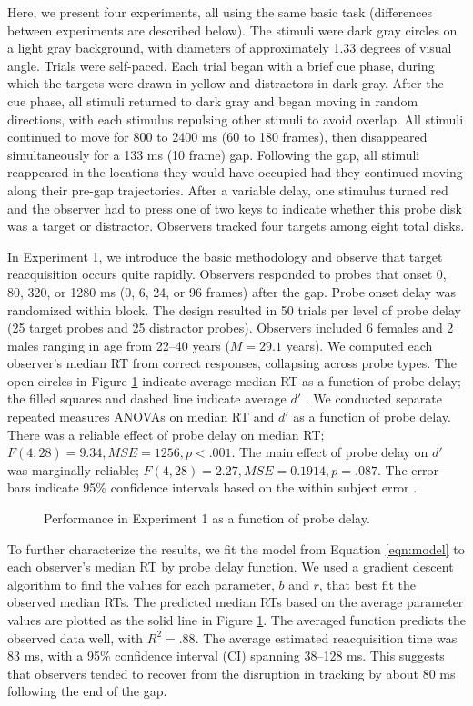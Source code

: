 \documentclass[jou,nobf]{apa}
\newcommand{\MSE}{\ensuremath{\mathit{MSE}}}
\begin{document}
Here, we present four experiments, all using the same basic task
(differences between experiments are described below).  The stimuli were
dark gray circles on a light gray background, with diameters of
approximately 1.33 degrees of visual angle.  Trials were self-paced.  Each
trial began with a brief cue phase, during which the targets were drawn in
yellow and distractors in dark gray.  After the cue phase, all stimuli
returned to dark gray and began moving in random directions, with each
stimulus repulsing other stimuli to avoid overlap.  All stimuli continued
to move for 800 to 2400 ms (60 to 180 frames), then disappeared
simultaneously for a 133 ms (10 frame) gap.  Following the gap, all stimuli
reappeared in the locations they would have occupied had they continued
moving along their pre-gap trajectories.  After a variable delay, one
stimulus turned red and the observer had to press one of two keys to
indicate whether this probe disk was a target or distractor.  Observers
tracked four targets among eight total disks.

In Experiment 1, we introduce the basic methodology and observe that target
reacquisition occurs quite rapidly.  Observers responded to probes that
onset 0, 80, 320, or 1280 ms (0, 6, 24, or 96 frames) after the gap.  Probe
onset delay was randomized within block.  The design resulted in 50 trials
per level of probe delay (25 target probes and 25 distractor probes).
Observers included 6 females and 2 males ranging in age from 22--40 years
($M = 29.1$ years).  We computed each observer's median RT from correct
responses, collapsing across probe types.  The open circles in Figure
\ref{fig:exp1} indicate average median RT as a function of probe delay; the
filled squares and dashed line indicate average $d'$
\cite{MacMillanCreelman2005}.  We conducted separate repeated measures
ANOVAs on median RT and $d'$ as a function of probe delay.  There was a
reliable effect of probe delay on median RT; $F(4,28) = 9.34, \MSE = 1256,
p < .001$.  The main effect of probe delay on $d'$ was marginally reliable;
$F(4, 28) = 2.27, \MSE = 0.1914, p = .087$.  The error bars indicate 95\%
confidence intervals based on the within subject error
\cite{MassonLoftus2003}.
\begin{figure}
  \centering
  \caption{Performance in Experiment 1 as a function of probe delay.}
  \label{fig:exp1}
\end{figure}

To further characterize the results, we fit the model from
Equation \ref{eqn:model} to each observer's median RT by probe delay
function.  We used a gradient descent algorithm to find the values for each
parameter, $b$ and $r$, that best fit the observed median RTs.  The
predicted median RTs based on the average parameter values are plotted as
the solid line in Figure \ref{fig:exp1}.  The averaged function predicts
the observed data well, with $R^2 = .88$.  The average estimated
reacquisition time was 83 ms, with a 95\% confidence interval (CI) spanning
38--128 ms.  This suggests that observers tended to recover from the
disruption in tracking by about 80 ms following the end of the gap.
\end{document}
